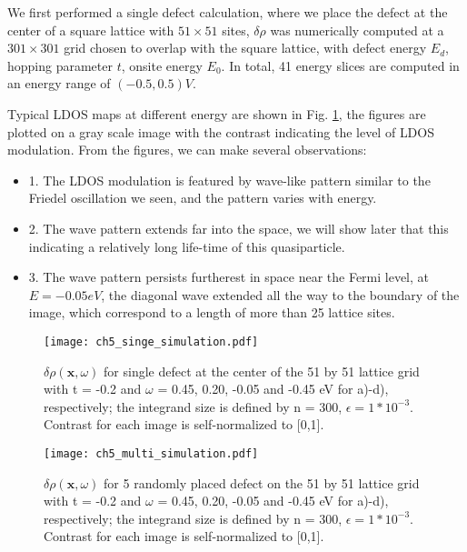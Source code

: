We first performed a single defect calculation, where we place the defect at the center of a square lattice with $51\times51$ sites, $\delta\rho$ was numerically computed at a $301\times301$ grid chosen to overlap with the square lattice, with defect energy $E_d$, hopping parameter $t$, onsite energy $E_0$. In total, 41 energy slices are computed in an energy range of $(-0.5, 0.5)V$.  

Typical \ac{LDOS} maps at different energy are shown in Fig. \ref{fig:ch5_single_scattering}, the figures are plotted on a gray scale image with the contrast indicating the level of \ac{LDOS} modulation. From the figures, we can make several observations:
\begin{itemize}
	\item 1. The \ac{LDOS} modulation is featured by wave-like pattern similar to the Friedel oscillation we seen, and the pattern varies with energy. 
	\item 2. The wave pattern extends far into the space, we will show later that this indicating a relatively long life-time of this quasiparticle. 
	\item 3. The wave pattern persists furtherest in space near the Fermi level, at $E=-0.05eV$, the diagonal wave extended all the way to the boundary of the image, which correspond to a length of more than 25 lattice sites. 
\end{itemize}

\begin{figure}
	\centering
	\texttt{[image: ch5\_singe\_simulation.pdf]} %
	\caption{$\delta\rho(\textbf{x},\omega)$ for single defect at the center of the 51 by 51 lattice grid with t = -0.2 and $\omega$ = 0.45, 0.20, -0.05 and -0.45 eV for a)-d), respectively; the integrand size is defined by n = 300, $\epsilon = 1*10^{-3}$. Contrast for each image is self-normalized to [0,1].}
	\label{fig:ch5_single_scattering}
\end{figure}

\begin{figure}
	\centering
	\texttt{[image: ch5\_multi\_simulation.pdf]} 
	\caption{$\delta\rho(\textbf{x},\omega)$ for 5 randomly placed defect on the 51 by 51 lattice grid with t = -0.2 and $\omega$ = 0.45, 0.20, -0.05 and -0.45 eV for a)-d), respectively; the integrand size is defined by n = 300, $\epsilon = 1*10^{-3}$. Contrast for each image is self-normalized to [0,1].}
	\label{fig:ch5_multi_scattering}
\end{figure}

